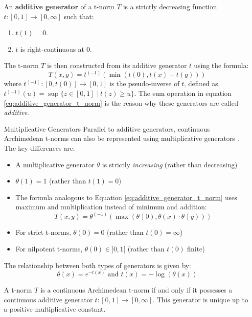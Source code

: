 An \textbf{additive generator} \cite[Def.~3.25]{Klement2000} of a t-norm $T$ is a strictly decreasing function $t: [0,1] \to [0, \infty]$ such that:
\begin{enumerate}
    \item $t(1) = 0$.
    \item $t$ is right-continuous at $0$.
\end{enumerate}
The t-norm $T$ is then constructed from its additive generator $t$ using the formula:
\begin{equation} \label{eq:additive_generator_t_norm}
    T(x,y) = t^{(-1)}( \min(t(0), t(x) + t(y)) )
\end{equation}
where $t^{(-1)}: [0, t(0)] \to [0,1]$ is the pseudo-inverse of $t$, defined as $t^{(-1)}(u) = \sup \{z \in [0,1] \mid t(z) \ge u \}$. The sum operation in equation \ref{eq:additive_generator_t_norm} is the reason why these generators are called \emph{additive}.

\begin{notation}{Multiplicative Generators}
    Parallel to additive generators, continuous Archimedean t-norms can also be represented using multiplicative generators \cite[Def.~3.36]{Klement2000}. The key differences are:
    \begin{itemize}
        \item A multiplicative generator $\theta$ is strictly \emph{increasing} (rather than decreasing)
        \item $\theta(1)=1$ (rather than $t(1)=0$)
        \item The formula analogous to Equation \ref{eq:additive_generator_t_norm} uses maximum and multiplication instead of minimum and addition:
        \[T(x,y) = \theta^{(-1)}(\max(\theta(0), \theta(x) \cdot \theta(y)))\]
        \item For strict t-norms, $\theta(0)=0$ (rather than $t(0)=\infty$)
        \item For nilpotent t-norms, $\theta(0) \in ]0,1[$ (rather than $t(0)$ finite)
    \end{itemize}
    The relationship between both types of generators is given by: \[\theta(x) = e^{-t(x)}\text{ and }t(x) = -\log(\theta(x))\]
    \end{notation}

    \begin{theorem}
        A t-norm $T$ is a continuous Archimedean t-norm if and only if it possesses a continuous additive generator $t: [0,1] \to [0,\infty]$. This generator is unique up to a positive multiplicative constant.
      \end{theorem}
    
